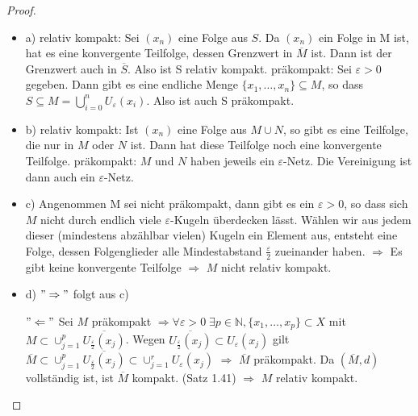 \documentclass[ngerman]{report}
\theoremstyle{plain}%
\theoremstyle{definition}%
\theoremstyle{myStyle}
\newcommand{\N}{\mathbb{N}}
\newcommand{\df}[1][]{%
	\overset{#1}{\Rightarrow}
}
\newcommand{\qmarks}[1]{"#1"}
\begin{document}
	\begin{proof}
		\begin{itemize}[]

			\item a) relativ kompakt: Sei $(x_n)$ eine Folge aus $S$. Da $(x_n)$ ein Folge in M ist, hat es eine konvergente Teilfolge, dessen Grenzwert in $\overline{M}$ ist. Dann ist der Grenzwert auch in $\overline{S}$. Also ist S relativ kompakt. 
				präkompakt: Sei $\varepsilon>0$ gegeben. Dann gibt es eine endliche Menge $\{x_1,\dots,x_n\}\subseteq M$, so dass $S\subseteq M = \bigcup^n_{i=0}U_\varepsilon(x_i)$. Also ist auch S präkompakt.
			
			\item b) relativ kompakt: Ist $(x_n)$ eine Folge aus $M\cup N$, so gibt es eine Teilfolge, die nur in $M$ oder $N$ ist. Dann hat diese Teilfolge noch eine konvergente Teilfolge.
				präkompakt: $M$ und $N$ haben jeweils ein $\varepsilon$-Netz. Die Vereinigung ist dann auch ein $\varepsilon$-Netz.
				
			\item c) Angenommen M sei nicht präkompakt, dann gibt es ein $\varepsilon>0$, so dass sich $M$ nicht durch endlich viele $\varepsilon$-Kugeln überdecken lässt. Wählen wir aus jedem dieser  (mindestens abzählbar vielen) Kugeln ein Element aus, entsteht eine Folge, dessen Folgenglieder alle Mindestabstand $\frac{\varepsilon}{2}$ zueinander haben. $\df$ Es gibt keine konvergente Teilfolge $\df$ $M$ nicht relativ kompakt.
			
			\item d) $\qmarks{\df}$ folgt aus c) \par
				$\qmarks{\Leftarrow}$ Sei $M$ präkompakt $\df \forall \varepsilon > 0\; \exists p\in\N, \{x_1,\dots,x_p\} \subset X$ mit $M \subset \cup_{j=1}^p \overline{ U_{\frac{\varepsilon}{2}}(x_j)}$. 
				Wegen $\overline{U_{\frac{\varepsilon}{2}}(x_j)} \subset U_{{\varepsilon}}(x_j)$ gilt
				$\overline{M} \subset \cup_{j=1}^p \overline{U_{\frac{\varepsilon}{2}}(x_j)} \subset \cup_{j=1}^r U_{\varepsilon}(x_j)$
				$\df$ $\overline{M}$ präkompakt. Da $(\overline{M},d)$ vollständig ist, ist $\overline{M}$ kompakt. (Satz 1.41) $\df$ $M$ relativ kompakt.
		\end{itemize}
	\end{proof}
\end{document}
